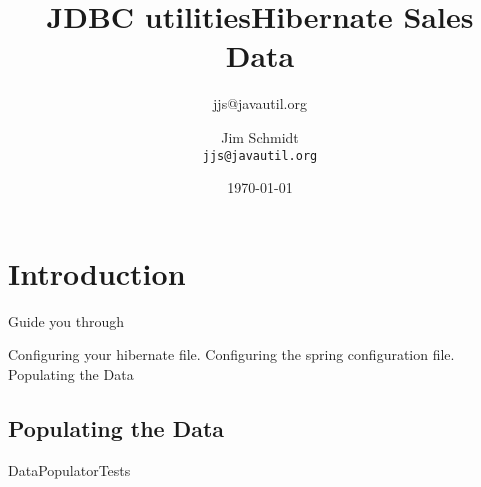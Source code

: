 \documentclass[a4paper,10pt]{book}
\title{JDBC utilities}
\author{jjs@javautil.org}
\begin{document}
\title{Hibernate Sales Data}
\author{Jim Schmidt\\
  \texttt{jjs@javautil.org}}
\date{\today}
\maketitle
\tableofcontents
\chapter{Introduction}
Guide you through

Configuring your hibernate file.
Configuring the spring configuration file.
Populating the Data

\section{Populating the Data}
DataPopulatorTests
\end{document}
